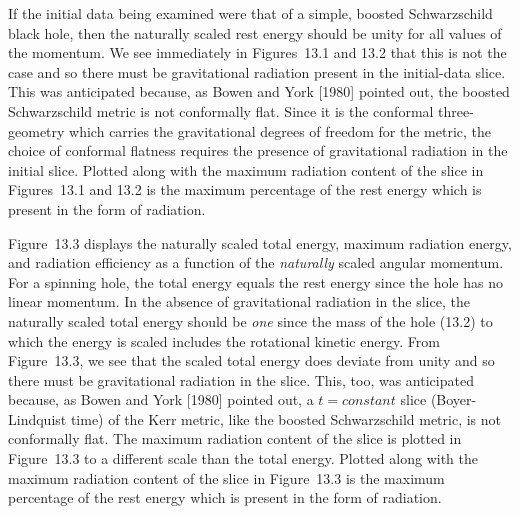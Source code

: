 

If the initial data being examined were that of a simple, boosted Schwarzschild
black hole, then the naturally scaled rest energy should be unity for all values
of the momentum.  We see immediately in Figures~13.1 and 13.2 that this is not
the case and so there must be gravitational radiation present in the
initial-data slice.  This was anticipated because, as Bowen and York [1980]
pointed out, the boosted Schwarzschild metric is not conformally flat.  Since it
is the conformal three-geometry which carries the gravitational degrees of
freedom for the metric, the choice of conformal flatness requires the presence of
gravitational radiation in the initial slice.  Plotted along with the maximum
radiation content of the slice in Figures~13.1 and 13.2 is the maximum
percentage of the rest energy which is present in the form of radiation.

Figure~13.3 displays the naturally scaled total energy, maximum radiation
energy, and radiation efficiency as a function of the {\it naturally} scaled
angular momentum.  For a spinning hole, the total energy equals the rest energy
since the hole has no linear momentum.  In the absence of gravitational
radiation in the slice, the naturally scaled total energy should be {\it one}
since the mass of the hole (13.2) to which the energy is scaled includes the
rotational kinetic energy.  From Figure~13.3, we see that the scaled total
energy does deviate from unity and so there must be gravitational radiation in
the slice.  This, too, was anticipated because, as Bowen and York [1980] pointed
out, a $t=constant$ slice (Boyer-Lindquist time) of the Kerr metric, like the
boosted Schwarzschild metric, is not conformally flat.  The maximum radiation
content of the slice is plotted in Figure~13.3 to a different scale than the
total energy.  Plotted along with the maximum radiation content of the slice in
Figure~13.3 is the maximum percentage of the rest energy which is present in the
form of radiation.

